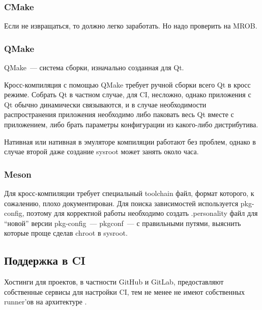 \subsubsection{CMake}

Если не извращаться, то должно легко заработать.
Но надо проверить на MROB.

\subsubsection{QMake}


QMake~--- система сборки, изначально созданная для Qt.

Кросс-компиляция с помощью QMake требует ручной сборки всего Qt в кросс режиме.
Собрать Qt в частном случае, для CI, несложно, однако приложения с Qt обычно динамически связываются, и в случае необходимости распространения приложения необходимо либо паковать весь Qt вместе с приложением, либо брать параметры конфигурации из какого-либо дистрибутива.

Нативная или нативная в эмуляторе компиляции работают без проблем, однако в случае второй даже создание sysroot может занять около часа.

\subsubsection{Meson}

Для кросс-компиляции требует специальный toolchain файл, формат которого, к сожалению, плохо документирован.
Для поиска зависимостей используется pkg-config, поэтому для корректной работы необходимо создать .personality файл для \enquote{новой} версии pkg-config~--- pkgconf~--- с правильными путями, выяснить которые проще сделав chroot в sysroot.

\subsection{Поддержка в CI}

Хостинги для проектов, в частности GitHub и GitLab, предоставляют собственные сервисы для настройки CI, тем не менее не имеют собственных runner'ов на архитектуре \riscv{}.


